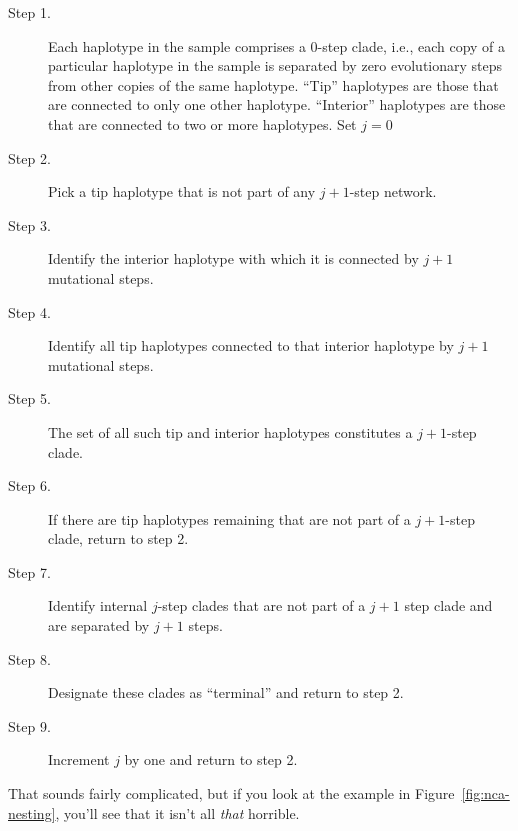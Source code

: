 \documentclass[12pt]{article}
\begin{document}
\begin{description}

\item[Step 1.] Each haplotype in the sample comprises a 0-step clade,
  i.e., each copy of a particular haplotype in the sample is separated
  by zero evolutionary steps from other copies of the same
  haplotype. ``Tip'' haplotypes are those that are connected to only
  one other haplotype. ``Interior'' haplotypes are those that are
  connected to two or more haplotypes. Set $j=0$

\item[Step 2.] Pick a tip haplotype that is not part of any $j+1$-step
  network.

\item[Step 3.] Identify the interior haplotype with which it is
  connected by $j+1$ mutational steps.

\item[Step 4.] Identify all tip haplotypes connected to that interior
  haplotype by $j+1$ mutational steps.

\item[Step 5.] The set of all such tip and interior haplotypes
  constitutes a $j+1$-step clade.

\item[Step 6.] If there are tip haplotypes remaining that are not part
  of a $j+1$-step clade, return to step 2.

\item[Step 7.] Identify internal $j$-step clades that are not part of
  a $j+1$ step clade and are separated by $j+1$ steps.

\item[Step 8.] Designate these clades as ``terminal'' and return to
  step 2.

\item[Step 9.] Increment $j$ by one and return to step 2.

\end{description}

\noindent That sounds fairly complicated, but if you look at the
example in Figure~\ref{fig:nca-nesting}, you'll see that it isn't all
{\it that\/} horrible.
\end{document}
